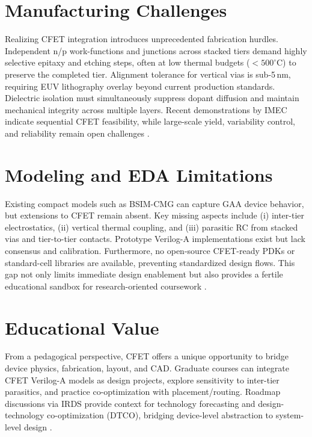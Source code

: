 \documentclass[conference]{IEEEtran}
\begin{document}
\section{Manufacturing Challenges}
Realizing CFET integration introduces unprecedented fabrication hurdles.
Independent n/p work-functions and junctions across stacked tiers demand highly selective epitaxy and etching steps, often at low thermal budgets ($<500^{\circ}$C) to preserve the completed tier.
Alignment tolerance for vertical vias is sub-5\,nm, requiring EUV lithography overlay beyond current production standards.
Dielectric isolation must simultaneously suppress dopant diffusion and maintain mechanical integrity across multiple layers.
Recent demonstrations by IMEC indicate sequential CFET feasibility, while large-scale yield, variability control, and reliability remain open challenges \cite{imec_cfet_iedm2020}.

\section{Modeling and EDA Limitations}
Existing compact models such as BSIM-CMG can capture GAA device behavior, but extensions to CFET remain absent.
Key missing aspects include (i) inter-tier electrostatics, (ii) vertical thermal coupling, and (iii) parasitic RC from stacked vias and tier-to-tier contacts.
Prototype Verilog-A implementations exist but lack consensus and calibration.
Furthermore, no open-source CFET-ready PDKs or standard-cell libraries are available, preventing standardized design flows.
This gap not only limits immediate design enablement but also provides a fertile educational sandbox for research-oriented coursework \cite{bsimcmg_sispad2017}.

\section{Educational Value}
From a pedagogical perspective, CFET offers a unique opportunity to bridge device physics, fabrication, layout, and CAD.
Graduate courses can integrate CFET Verilog-A models as design projects, explore sensitivity to inter-tier parasitics, and practice co-optimization with placement/routing.
Roadmap discussions via IRDS provide context for technology forecasting and design-technology co-optimization (DTCO), bridging device-level abstraction to system-level design \cite{irds_2023}.
\end{document}
